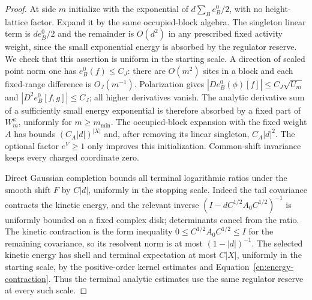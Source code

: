\begin{proof}
At side $m$ initialize with the exponential of
$d\sum_B e_B^0/2$, with no height-lattice factor.  Expand it
by the same occupied-block algebra.  The singleton linear term
is $d e_B^0/2$ and the remainder is $O(d^2)$ in any prescribed
fixed activity weight, since the small exponential energy is
absorbed by the regulator reserve.  We check that this assertion is
uniform in the starting scale.  A direction of scaled point norm one
has $e_B^0(f)\le C_J$: there are $O(m^2)$ sites in a block and each
fixed-range difference is $O_J(m^{-1})$.  Polarization gives
$|De_B^0(\phi)[f]|\le C_J\sqrt{U_m}$ and
$|D^2e_B^0[f,g]|\le C_J$; all higher derivatives vanish.
The analytic derivative sum of a sufficiently small energy exponential
is therefore absorbed by a fixed part of $W_m^\kappa$, uniformly for
$m\ge m_{\min}$.  The occupied-block expansion with the fixed weight
$A$ has bounds $(C_A|d|)^{|X|}$ and, after removing its linear
singleton, $C_A|d|^2$.  The optional factor $e^V\ge1$ only improves
this initialization.  Common-shift invariance keeps every charged
coordinate zero.

Direct Gaussian completion bounds all terminal logarithmic
ratios under the smooth shift $F$ by $C|d|$, uniformly in
the stopping scale.  Indeed the tail covariance contracts
the kinetic energy, and the relevant inverse
$(I-dC^{1/2}A_0C^{1/2})^{-1}$ is uniformly bounded on a fixed
complex disk; determinants cancel from the ratio.
The kinetic contraction is the form inequality
$0\le C^{1/2}A_0C^{1/2}\le I$ for the remaining covariance, so
its resolvent norm is at most $(1-|d|)^{-1}$.  The selected kinetic
energy has shell and terminal expectation at most $C|X|$, uniformly
in the starting scale, by the positive-order kernel estimates and
Equation~\eqref{en:energy-contraction}.  Thus the terminal analytic
estimates use the same regulator reserve at every such scale.


\end{proof}

